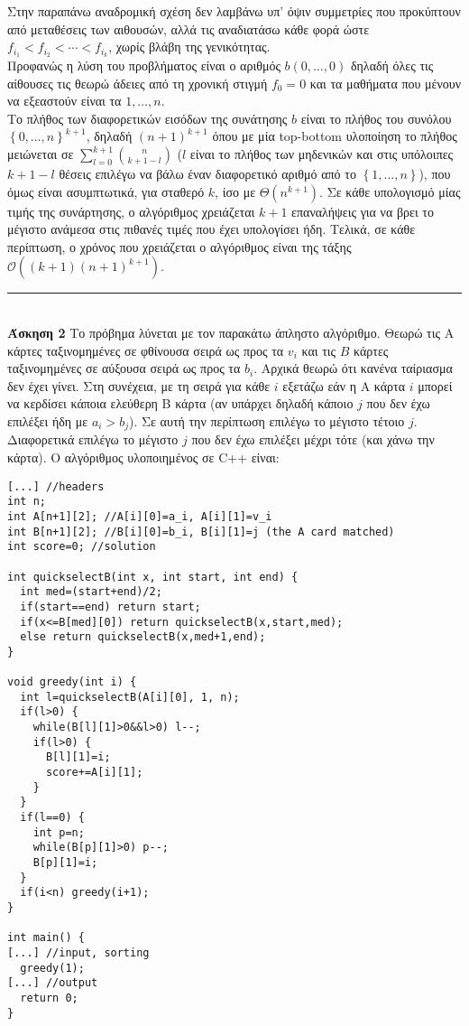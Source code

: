 \documentclass[12pt]{article}
\newcommand\en[1]{\latintext #1\greektext}
\newcommand\bigOh{\mathcal{O}}
\newcommand{\HRule}{\rule{\linewidth}{0.1mm}}
\begin{document}
Στην παραπάνω αναδρομική σχέση δεν λαμβάνω υπ' όψιν συμμετρίες που προκύπτουν από μεταθέσεις των αιθουσών, αλλά τις αναδιατάσω κάθε φορά ώστε $f_{i_1}<f_{i_2}<\cdots<f_{i_k}$, χωρίς βλάβη της γενικότητας.\\
Προφανώς η λύση του προβλήματος είναι ο αριθμός $b\left(0,\ldots,0\right)$ δηλαδή όλες τις αίθουσες τις θεωρώ άδειες από τη χρονική στιγμή $f_0=0$ και τα μαθήματα που μένουν να εξεαστούν είναι τα $1,\ldots,n$.\\
Το πλήθος των διαφορετικών εισόδων της συνάτησης $b$ είναι το πλήθος του συνόλου $\left\{0,\ldots,n\right\}^{k+1}$, δηλαδή $\left(n+1\right)^{k+1}$ όπου με μία \en{top-bottom} υλοποίηση το πλήθος μειώνεται σε $\sum_{l=0}^{k+1}\binom{n}{k+1-l}$ ($l$ είναι το πλήθος των μηδενικών και στις υπόλοιπες $k+1-l$ θέσεις επιλέγω να βάλω έναν διαφορετικό αριθμό από το $\left\{1,\ldots,n\right\}$), που όμως είναι ασυμπτωτικά, για σταθερό $k$, ίσο με $\Theta\left(n^{k+1}\right)$. Σε κάθε υπολογισμό μίας τιμής της συνάρτησης, ο αλγόριθμος χρειάζεται $k+1$ επαναλήψεις για να βρει το μέγιστο ανάμεσα στις πιθανές τιμές που έχει υπολογίσει ήδη. Τελικά, σε κάθε περίπτωση, ο χρόνος που χρειάζεται ο αλγόριθμος είναι της τάξης $\bigOh\left(\left(k+1\right)\left(n+1\right)^{k+1}\right)$.\\
\HRule\\
{\bf Άσκηση 2} Το πρόβημα λύνεται με τον παρακάτω άπληστο αλγόριθμο. Θεωρώ τις Α κάρτες ταξινομημένες σε φθίνουσα σειρά ως προς τα $v_i$ και τις $B$ κάρτες ταξινομημένες σε αύξουσα σειρά ως προς τα $b_i$. Αρχικά θεωρώ ότι κανένα ταίριασμα δεν έχει γίνει. Στη συνέχεια, με τη σειρά για κάθε $i$ εξετάζω εάν η Α κάρτα $i$ μπορεί να κερδίσει κάποια ελεύθερη Β κάρτα (αν υπάρχει δηλαδή κάποιο $j$ που δεν έχω επιλέξει ήδη με $a_i>b_j$). Σε αυτή την περίπτωση επιλέγω το μέγιστο τέτοιο $j$. Διαφορετικά επιλέγω το μέγιστο $j$ που δεν έχω επιλέξει μέχρι τότε (και χάνω την κάρτα). Ο αλγόριθμος υλοποιημένος σε \en{C++} είναι:
\latintext\begin{lstlisting}
[...] //headers
int n;
int A[n+1][2]; //A[i][0]=a_i, A[i][1]=v_i
int B[n+1][2]; //B[i][0]=b_i, B[i][1]=j (the A card matched)
int score=0; //solution

int quickselectB(int x, int start, int end) {
  int med=(start+end)/2;
  if(start==end) return start;
  if(x<=B[med][0]) return quickselectB(x,start,med);
  else return quickselectB(x,med+1,end);
}

void greedy(int i) {
  int l=quickselectB(A[i][0], 1, n);
  if(l>0) {
    while(B[l][1]>0&&l>0) l--;
    if(l>0) {
      B[l][1]=i;
      score+=A[i][1];
    }
  }
  if(l==0) {
    int p=n;
    while(B[p][1]>0) p--;
    B[p][1]=i;
  }
  if(i<n) greedy(i+1);
}

int main() {
[...] //input, sorting
  greedy(1);
[...] //output
  return 0;
}
\end{lstlisting}\greektext
\end{document}
